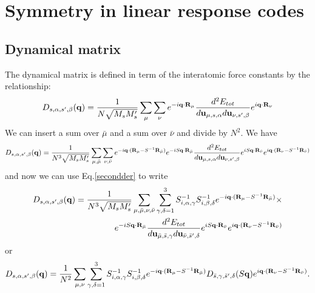 \documentclass[12pt,a4paper,twoside]{report}
\begin{document}
{\color{dark-blue}\chapter{Symmetry in linear response codes}}
\color{black}

\section{Dynamical matrix}

The dynamical matrix is defined in term of the interatomic force constants by the relationship:
\begin{equation}
D_{s,\alpha,s',\beta}({\bf q}) =
{1 \over N \sqrt{M_s M_s'}} \sum_{\mu} \sum_{\nu}
e^{-i {\bf q} \cdot {\bf R}_\mu}
{d^2 E_{tot} \over d {\bf u}_{\mu,s,\alpha} d {\bf u}_{\nu,s',\beta}}
e^{i {\bf q} \cdot {\bf R}_\nu}
\end{equation}
We can insert a sum over $\bar \mu$ and a sum over
$\bar \nu$ and divide by $N^2$. We have
\begin{equation}
D_{s,\alpha,s',\beta}({\bf q}) =
{1 \over N^3 \sqrt{M_s M_s'}} \sum_{\mu,\bar \mu} \sum_{\nu,\bar \nu}
e^{-i {\bf q} \cdot ({\bf R}_\mu - S^{-1}{\bf R}_{\bar \mu}) }
e^{-i S {\bf q} \cdot {\bf R}_{\bar \mu}}
{d^2 E_{tot} \over d {\bf u}_{\mu,s,\alpha} d {\bf u}_{\nu,s',\beta}}
e^{i S {\bf q} \cdot {\bf R}_{\bar \nu}}
e^{i {\bf q} \cdot ({\bf R}_\nu - S^{-1}{\bf R}_{\bar \nu})}
\end{equation}
and now we can use Eq.\ref{secondder} to write
\begin{eqnarray}
D_{s,\alpha,s',\beta}({\bf q}) =
{1 \over N^3 \sqrt{M_s M_s'}} \sum_{\mu,\bar \mu, \nu,\bar \nu} \sum_{\gamma,\delta=1}^3  S^{-1}_{i,\alpha,\gamma} S^{-1}_{i,\beta,\delta}
e^{-i {\bf q} \cdot ({\bf R}_\mu - S^{-1}{\bf R}_{\bar \mu}) } \times \nonumber \\
e^{-i S{\bf q} \cdot {\bf R}_{\bar \mu}}
{d^2 E_{tot} \over d {\bf u}_{{\bar \mu},{\bar s},\gamma}d {\bf u}_{{\bar \nu},{\bar s}',\delta} }
e^{i S{\bf q} \cdot {\bf R}_{\bar \nu}}
e^{i {\bf q} \cdot ({\bf R}_\nu - S^{-1}{\bf R}_{\bar \nu})}
\end{eqnarray}
or
\begin{equation}
D_{s,\alpha,s',\beta}({\bf q}) =
{1 \over N^2 }\sum_{\mu, \nu} \sum_{\gamma,\delta=1}^3  S^{-1}_{i,\alpha,\gamma} S^{-1}_{i,\beta,\delta}
e^{-i {\bf q} \cdot ({\bf R}_\mu - S^{-1}{\bf R}_{\bar \mu}) }
D_{\bar s,\gamma,\bar s',\delta}(S{\bf q})
e^{i {\bf q} \cdot ({\bf R}_\nu - S^{-1}{\bf R}_{\bar \nu})}.
\end{equation}
\end{document}
